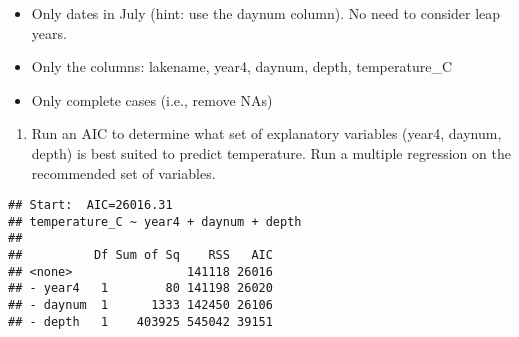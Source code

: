 \documentclass[]{article}
\newenvironment{Shaded}{\begin{snugshade}}{\end{snugshade}}
\newcommand{\KeywordTok}[1]{\textcolor[rgb]{0.13,0.29,0.53}{\textbf{#1}}}
\newcommand{\DataTypeTok}[1]{\textcolor[rgb]{0.13,0.29,0.53}{#1}}
\newcommand{\DecValTok}[1]{\textcolor[rgb]{0.00,0.00,0.81}{#1}}
\newcommand{\StringTok}[1]{\textcolor[rgb]{0.31,0.60,0.02}{#1}}
\newcommand{\CommentTok}[1]{\textcolor[rgb]{0.56,0.35,0.01}{\textit{#1}}}
\newcommand{\OperatorTok}[1]{\textcolor[rgb]{0.81,0.36,0.00}{\textbf{#1}}}
\newcommand{\NormalTok}[1]{#1}
\providecommand{\tightlist}{%
  \setlength{\itemsep}{0pt}\setlength{\parskip}{0pt}}
\begin{document}
\begin{itemize}
\tightlist
\item
  Only dates in July (hint: use the daynum column). No need to consider
  leap years.
\item
  Only the columns: lakename, year4, daynum, depth, temperature\_C
\item
  Only complete cases (i.e., remove NAs)
\end{itemize}

\begin{enumerate}
\def\labelenumi{\arabic{enumi}.}
\setcounter{enumi}{3}
\tightlist
\item
  Run an AIC to determine what set of explanatory variables (year4,
  daynum, depth) is best suited to predict temperature. Run a multiple
  regression on the recommended set of variables.
\end{enumerate}

\begin{Shaded}
\end{Shaded}

\begin{verbatim}
## Start:  AIC=26016.31
## temperature_C ~ year4 + daynum + depth
## 
##          Df Sum of Sq    RSS   AIC
## <none>                141118 26016
## - year4   1        80 141198 26020
## - daynum  1      1333 142450 26106
## - depth   1    403925 545042 39151
\end{verbatim}
\end{document}
